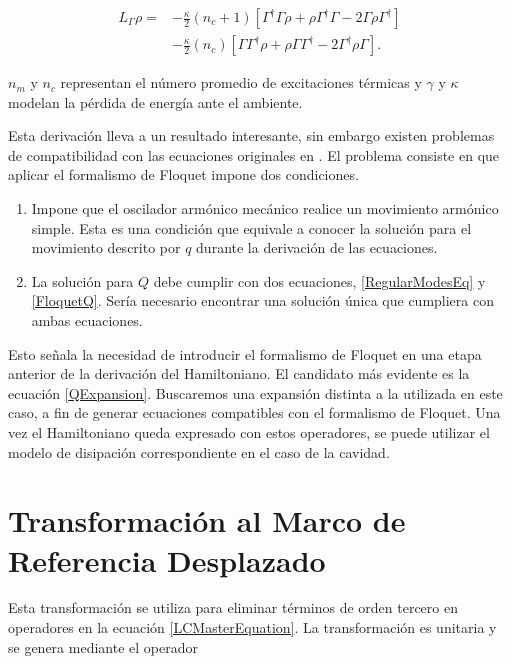 \documentclass[10pt,a4paper]{report}
\begin{document}
\begin{align}
L_\Gamma \rho =& - \frac{\kappa}{2}(n_c + 1)[\Gamma^\dagger \Gamma\rho + \rho \Gamma^\dagger \Gamma -2\Gamma\rho \Gamma^\dagger]  \\
 &- \frac{\kappa}{2}(n_c)[ \Gamma\Gamma^\dagger\rho + \rho  \Gamma\Gamma^\dagger -2\Gamma^\dagger\rho \Gamma].\nonumber
\end{align}

$n_m$ y $n_c$ representan el número promedio de excitaciones térmicas y $\gamma$ y $\kappa$ modelan la pérdida de energía ante el ambiente. 

Esta derivación lleva a un resultado interesante, sin embargo existen problemas de compatibilidad con las ecuaciones originales en \cite{LawOH}. El problema consiste en que aplicar el formalismo de Floquet impone dos condiciones. 

\begin{enumerate}
\item Impone que el oscilador armónico mecánico realice un movimiento armónico simple. Esta es una condición que equivale a conocer la solución para el movimiento descrito por $q$ durante la derivación de las ecuaciones.

\item La solución para $Q$ debe cumplir con dos ecuaciones, \eqref{RegularModesEq} y \eqref{FloquetQ}. Sería necesario encontrar una solución única que cumpliera con ambas ecuaciones. 
\end{enumerate}

Esto señala la necesidad de introducir el formalismo de Floquet en una etapa anterior de la derivación del Hamiltoniano. El candidato más evidente es la ecuación \eqref{QExpansion}. Buscaremos una expansión distinta a la utilizada en este caso, a fin de generar ecuaciones compatibles con el formalismo de Floquet. Una vez el Hamiltoniano queda expresado con estos operadores, se puede utilizar el modelo de disipación correspondiente en el caso de la cavidad.



\section{Transformación al Marco de Referencia Desplazado}

Esta transformación se utiliza para eliminar términos de orden tercero en operadores en la ecuación \eqref{LCMasterEquation}. La transformación es unitaria y se genera mediante el operador
\end{document}
